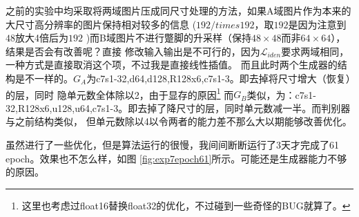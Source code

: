 \documentclass[twocolumn,11pt]{ctexart}
\begin{document}
之前的实验中均采取将两域图片压成同尺寸处理的方法，如果A域图片作为本来的大尺寸高分辨率的图片保持相对较多的信息
($192/times 192$，取$192$是因为注意到$48$放大4倍后为$192$
)而B域图片不进行蹩脚的升采样（保持$48\times 48$而非$64\times 64$），结果是否会有改善呢？直接
修改输入输出是不可行的，因为$\mathcal{L}_{iden}$要求两域相同，一种方式是直接取消这个项，不过我是直接线性插值。
而且此时两个生成器的结构是不一样的。$G_A$为c7s1-32,d64,d128,R128x6,c7s1-3。即去掉将尺寸增大（恢复）的层，同时
隐单元数全体除以2，由于显存的原因\footnote{这里也考虑过float16替换float32的优化，不过碰到一些奇怪的BUG就算了。}
而$G_B$类似，为：c7s1-32,R128x6,u128,u64,c7s1-3。即去掉了降尺寸的层，同时单元数减一半。而判别器与之前结构类似，
但单元数除以4以令两者的能力差不那么大以期能够改善优化。

虽然进行了一些优化，但是算法运行的很慢，我间间断断运行了3天才完成了61 epoch。效果也不怎么样，如图 
\ref{fig:exp7epoch61}所示。可能还是生成器能力不够的原因。
\end{document}
